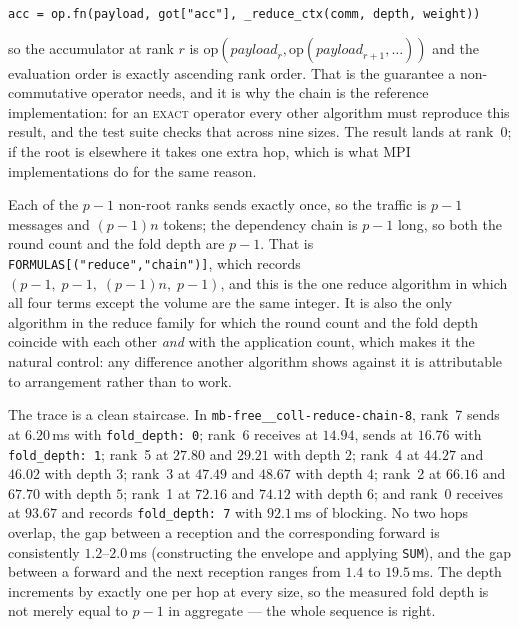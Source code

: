 \documentclass[11pt]{article}
\begin{document}
\begin{center}
\texttt{acc = op.fn(payload, got["acc"], \_reduce\_ctx(comm, depth, weight))}
\end{center}

so the accumulator at rank $r$ is $\mathrm{op}(\mathit{payload}_r, \mathrm{op}(\mathit{payload}_{r+1}, \dots))$
and the evaluation order is exactly ascending rank order. That is the guarantee a
non-commutative operator needs, and it is why the chain is the reference implementation: for an
\textsc{exact} operator every other algorithm must reproduce this result, and the test suite
checks that across nine sizes. The result lands at rank~0; if the root is elsewhere it takes one
extra hop, which is what MPI implementations do for the same reason.

Each of the $p-1$ non-root ranks sends exactly once, so the traffic is $p-1$ messages and
$(p-1)n$ tokens; the dependency chain is $p-1$ long, so both the round count and the fold depth
are $p-1$. That is \texttt{FORMULAS[("reduce","chain")]}, which records
$(p-1,\;p-1,\;(p-1)n,\;p-1)$, and this is the one reduce algorithm in which all four terms
except the volume are the same integer. It is also the only algorithm in the reduce family for
which the round count and the fold depth coincide with each other \emph{and} with the
application count, which makes it the natural control: any difference another algorithm shows
against it is attributable to arrangement rather than to work.

The trace is a clean staircase. In \texttt{mb-free\_\_coll-reduce-chain-8}, rank~7 sends at
$6.20$\,ms with \texttt{fold\_depth: 0}; rank~6 receives at $14.94$, sends at $16.76$ with
\texttt{fold\_depth: 1}; rank~5 at $27.80$ and $29.21$ with depth $2$; rank~4 at $44.27$ and
$46.02$ with depth $3$; rank~3 at $47.49$ and $48.67$ with depth $4$; rank~2 at $66.16$ and
$67.70$ with depth $5$; rank~1 at $72.16$ and $74.12$ with depth $6$; and rank~0 receives at
$93.67$ and records \texttt{fold\_depth: 7} with $92.1$\,ms of blocking. No two hops overlap,
the gap between a reception and the corresponding forward is consistently $1.2$--$2.0$\,ms
(constructing the envelope and applying \texttt{SUM}), and the gap between a forward and the
next reception ranges from $1.4$ to $19.5$\,ms. The depth increments by exactly one per hop at
every size, so the measured fold depth is not merely equal to $p-1$ in aggregate --- the whole
sequence is right.
\end{document}
